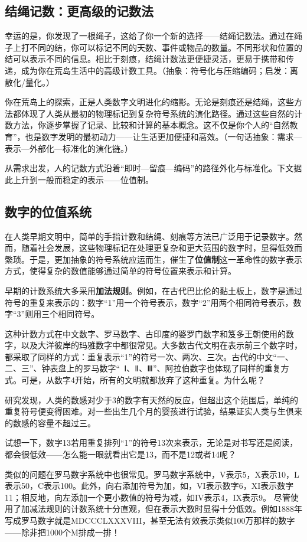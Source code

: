\subsection*{结绳记数：更高级的记数法}
幸运的是，你发现了一根绳子，这给了你一个新的选择——结绳记数法。通过在绳子上打不同的结，你可以标记不同的天数、事件或物品的数量。不同形状和位置的结可以表示不同的信息。相比于刻痕，结绳计数法更便捷灵活，更易于携带和传递，成为你在荒岛生活中的高级计数工具。{（抽象：符号化与压缩编码；启发：离散化/量化。）}

你在荒岛上的探索，正是人类数字文明进化的缩影。无论是刻痕还是结绳，这些方法都体现了人类从最初的物理标记到复杂符号系统的演化路径。通过这些自然的计数方法，你逐步掌握了记录、比较和计算的基本概念。这不仅是你个人的“自然教育”，也是数字发明的最初动力——让生活更加便捷和高效。{（一句话抽象：需求—表示—外部化—标准化的演化链。）}

从需求出发，人的记数方式沿着“即时—留痕—编码”的路径外化与标准化。下文据此上升到一般而稳定的表示——位值制。

\subsection{数字的位值系统}
在人类早期文明中，简单的手指计数和结绳、刻痕等方法已广泛用于记录数字。然而，随着社会发展，这些物理标记在处理更复杂和更大范围的数字时，显得低效而繁琐。于是，更加抽象的符号系统应运而生，催生了{\bf 位值制}这一革命性的数字表示方式，使得复杂的数值能够通过简单的符号位置来表示和计算。

早期的计数系统大多采用{\bf 加法规则}。例如，在古代巴比伦的黏土板上，数字是通过符号的重复来表示的：数字“1”用一个符号表示，数字“2”用两个相同符号表示，数字“3”则用三个相同符号。

这种计数方式在中文数字、罗马数字、古印度的婆罗门数字和笈多王朝使用的数字，以及大洋彼岸的玛雅数字中都很常见。大多数古代文明在表示前三个数字时，都采取了同样的方式：重复表示“1”的符号一次、两次、三次。古代的中文“一、二、三”、钟表盘上的罗马数字“~Ⅰ、Ⅱ、Ⅲ”、阿拉伯数字也体现了同样的重复方式。可是，从数字4开始，所有的文明就都放弃了这种重复。为什么呢？

研究发现，人类的数感对少于3的数字有天然的反应，但超出这个范围后，单纯的重复符号便变得困难。对一些出生几个月的婴孩进行试验，结果证实人类与生俱来的数感的容量不超过三。

试想一下，数字13若用重复排列“1”的符号13次来表示，无论是对书写还是阅读，都会很低效——怎么能一眼就看出它是13，而不是12或者14呢？

类似的问题在罗马数字系统中也很常见。罗马数字系统中，V表示5，X表示10，L表示50，C表示100。此外，向右添加符号为加，如，VI表示数字6，XI表示数字11；相反地，向左添加一个更小数值的符号为减，如IV表示4，IX表示9。
尽管使用了加减法规则的计数系统十分直观，但在表示大数时显得十分低效。例如1888年写成罗马数字就是MDCCCLXXXVIII，甚至无法有效表示类似100万那样的数字——除非把1000个M排成一排！

